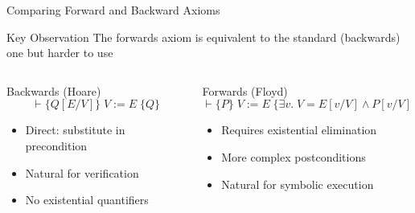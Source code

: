 \begin{frame}{Comparing Forward and Backward Axioms}
    \begin{block}{Key Observation}
        The forwards axiom is equivalent to the standard (backwards) one but harder to use
    \end{block}
    
    \begin{columns}
        \begin{column}{0.48\textwidth}
            \begin{block}{Backwards (Hoare)}
                \[ \vdash \{Q[E/V]\} \; V := E \; \{Q\} \]
                \begin{itemize}
                    \item Direct: substitute in precondition
                    \item Natural for verification
                    \item No existential quantifiers
                \end{itemize}
            \end{block}
        \end{column}
        \begin{column}{0.48\textwidth}
            \begin{block}{Forwards (Floyd)}
                \[ \vdash \{P\} \; V := E \; \{\exists v. \; V = E[v/V] \wedge P[v/V]\} \]
                \begin{itemize}
                    \item Requires existential elimination
                    \item More complex postconditions
                    \item Natural for symbolic execution
                \end{itemize}
            \end{block}
        \end{column}
    \end{columns}
\end{frame}

